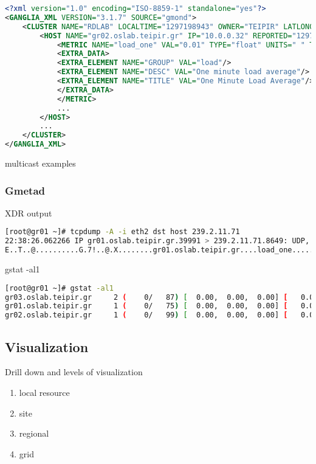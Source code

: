 \begin{lstlisting}[language=XML,caption=Gmond XML cluster report]
<?xml version="1.0" encoding="ISO-8859-1" standalone="yes"?>
<GANGLIA_XML VERSION="3.1.7" SOURCE="gmond">
	<CLUSTER NAME="RDLAB" LOCALTIME="1297198943" OWNER="TEIPIR" LATLONG="unspecified" URL="unspecified">
		<HOST NAME="gr02.oslab.teipir.gr" IP="10.0.0.32" REPORTED="1297198934" TN="8" TMAX="20" DMAX="0" LOCATION="unspecified" GMOND_STARTED="1296569542">
			<METRIC NAME="load_one" VAL="0.01" TYPE="float" UNITS=" " TN="50" TMAX="70" DMAX="0" SLOPE="both">
			<EXTRA_DATA>
			<EXTRA_ELEMENT NAME="GROUP" VAL="load"/>
			<EXTRA_ELEMENT NAME="DESC" VAL="One minute load average"/>
			<EXTRA_ELEMENT NAME="TITLE" VAL="One Minute Load Average"/>
			</EXTRA_DATA>
			</METRIC>
			...
		</HOST>
		...
	</CLUSTER>
</GANGLIA_XML>
\end{lstlisting}
multicast examples

\subsubsection{Gmetad}

XDR output

\begin{lstlisting}[language=bash,caption=XDR sample]
[root@gr01 ~]# tcpdump -A -i eth2 dst host 239.2.11.71
22:38:26.062266 IP gr01.oslab.teipir.gr.39991 > 239.2.11.71.8649: UDP, length 56
E..T..@..........G.7!..@.X........gr01.oslab.teipir.gr....load_one........%.2f..
\end{lstlisting}

gstat -al1

\begin{lstlisting}[language=bash,caption=Gstat output]
[root@gr01 ~]# gstat -al1
gr03.oslab.teipir.gr     2 (    0/   87) [  0.00,  0.00,  0.00] [   0.0,   0.0,   0.0,  99.9,   0.1] OFF
gr01.oslab.teipir.gr     1 (    0/   75) [  0.00,  0.00,  0.00] [   0.0,   0.0,   0.0,  99.9,   0.0] OFF
gr02.oslab.teipir.gr     1 (    0/   99) [  0.00,  0.00,  0.00] [   0.0,   0.0,   0.1,  99.9,   0.0] OFF
\end{lstlisting}

\subsection{Visualization}
Drill down and levels of visualization
\begin{enumerate}
  \item local resource
  \item site
  \item regional
  \item grid
\end{enumerate}

